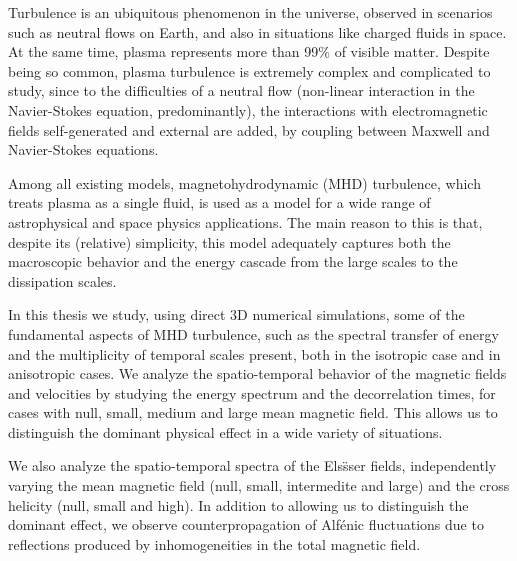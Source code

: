 Turbulence is an ubiquitous phenomenon in the universe, observed in
scenarios such as neutral flows on Earth, and also in situations like
charged fluids in space. At the same time, plasma represents more than
99\% of visible matter. Despite being so common, plasma turbulence is
extremely complex and complicated to study, since to the difficulties
of a neutral flow (non-linear interaction in the Navier-Stokes
equation, predominantly), the interactions with electromagnetic fields
self-generated and external are added, by coupling between Maxwell and
Navier-Stokes equations.

Among all existing models, magnetohydrodynamic (MHD) turbulence, which
treats plasma as a single fluid, is used as a model for a wide range
of astrophysical and space physics applications. The main reason to
this is that, despite its (relative) simplicity, this model adequately
captures both the macroscopic behavior and the energy cascade from the
large scales to the dissipation scales.

In this thesis we study, using direct 3D numerical simulations, some
of the fundamental aspects of MHD turbulence, such as the spectral
transfer of energy and the multiplicity of temporal scales present,
both in the isotropic case and in anisotropic cases. We analyze the
spatio-temporal behavior of the magnetic fields and velocities by
studying the energy spectrum and the decorrelation times, for cases
with null, small, medium and large mean magnetic field. This allows us
to distinguish the dominant physical effect in a wide variety of
situations.

We also analyze the spatio-temporal spectra of the Els\"sser fields,
independently varying the mean magnetic field (null, small,
intermedite and large) and the cross helicity (null, small and
high). In addition to allowing us to distinguish the dominant effect,
we observe counterpropagation of Alf\'enic fluctuations due to
reflections produced by inhomogeneities in the total magnetic field.